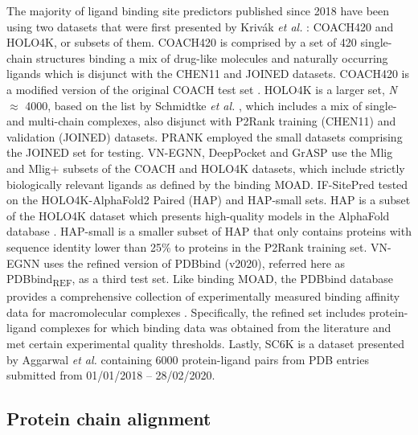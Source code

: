 The majority of ligand binding site predictors published since 2018 have been using two datasets that were first presented by Krivák \textit{et al.} \cite{KRIVAK_2018_P2RANK}: COACH420 and HOLO4K, or subsets of them. COACH420 is comprised by a set of 420 single-chain structures binding a mix of drug-like molecules and naturally occurring ligands which is disjunct with the CHEN11 and JOINED datasets. COACH420 is a modified version of the original COACH test set \cite{ROY_2012_COFACTOR, YANG_2013_COFACTOR}. HOLO4K is a larger set, \textit{N} $\approx$ 4000, based on the list by Schmidtke \textit{et al.} \cite{SCHMIDTKE_2010_BENCHMARK}, which includes a mix of single- and multi-chain complexes, also disjunct with P2Rank training (CHEN11) and validation (JOINED) datasets. PRANK employed the small datasets comprising the JOINED set for testing. VN-EGNN, DeepPocket and GrASP use the Mlig and Mlig+ subsets of the COACH and HOLO4K datasets, which include strictly biologically relevant ligands as defined by the binding MOAD. IF-SitePred tested on the HOLO4K-AlphaFold2 Paired (HAP) and HAP-small sets. HAP is a subset of the HOLO4K dataset which presents high-quality models in the AlphaFold database \cite{VARADI_2022_ALPHAFOLDDB}. HAP-small is a smaller subset of HAP that only contains proteins with sequence identity lower than 25\% to proteins in the P2Rank training set. VN-EGNN uses the refined version of PDBbind (v2020), referred here as PDBbind\textsubscript{REF}, as a third test set. Like binding MOAD, the PDBbind database provides a comprehensive collection of experimentally measured binding affinity data for macromolecular complexes \cite{WANG_2004_PDBBIND, WANG_2005_PDBBIND, CHENG_2009_PDBBIND, LI_2014_PDBBIND, LIU_2015_PDBBIND, LIU_2017_PDBBIND}. Specifically, the refined set includes protein-ligand complexes for which binding data was obtained from the literature and met certain experimental quality thresholds. Lastly, SC6K is a dataset presented by Aggarwal \textit{et al.} \cite{AGGARWAL_2022_DEEPPOCKET} containing 6000 protein-ligand pairs from PDB entries submitted from 01/01/2018 – 28/02/2020.

\subsection{Protein chain alignment}

